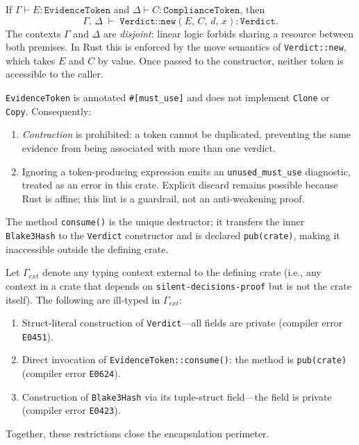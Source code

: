 \begin{axiom}
\label{ax:intro}
If $\Gamma \vdash E : \texttt{EvidenceToken}$ and
$\Delta \vdash C : \texttt{ComplianceToken}$, then
\[
  \Gamma,\, \Delta \;\vdash\; \texttt{Verdict::new}(E,\, C,\, d,\, x)
  : \texttt{Verdict}.
\]
The contexts $\Gamma$ and $\Delta$ are \emph{disjoint}: linear logic
forbids sharing a resource between both premises.  In Rust this is
enforced by the move semantics of \texttt{Verdict::new}, which takes
$E$ and $C$ by value.  Once passed to the constructor, neither token
is accessible to the caller.
\end{axiom}

\begin{axiom}
\label{ax:unique}
\texttt{EvidenceToken} is annotated \texttt{\#[must\_use]} and does
not implement \texttt{Clone} or \texttt{Copy}.  Consequently:
\begin{enumerate}
  \item \emph{Contraction} is prohibited: a token cannot be
    duplicated, preventing the same evidence from being
    associated with more than one verdict.
  \item Ignoring a token-producing expression emits an
    \texttt{unused\_must\_use} diagnostic, treated as an error in this
    crate.  Explicit discard remains possible because Rust is affine;
    this lint is a guardrail, not an anti-weakening proof.
\end{enumerate}
The method \texttt{consume()} is the unique destructor; it transfers
the inner \texttt{Blake3Hash} to the \texttt{Verdict} constructor and
is declared \texttt{pub(crate)}, making it inaccessible outside the
defining crate.
\end{axiom}

\begin{axiom}
\label{ax:encap}
Let $\Gamma_{\mathit{ext}}$ denote any typing context external to the
defining crate (i.e., any context in a crate that depends on
\texttt{silent-decisions-proof} but is not the crate itself).
The following are ill-typed in $\Gamma_{\mathit{ext}}$:
\begin{enumerate}
  \item Struct-literal construction of \texttt{Verdict}---all fields
    are private (compiler error \texttt{E0451}).
  \item Direct invocation of \texttt{EvidenceToken::consume()}:
    the method is \texttt{pub(crate)} (compiler error \texttt{E0624}).
  \item Construction of \texttt{Blake3Hash} via its tuple-struct
    field---the field is private (compiler error \texttt{E0423}).
\end{enumerate}
Together, these restrictions close the encapsulation perimeter.
\end{axiom}


